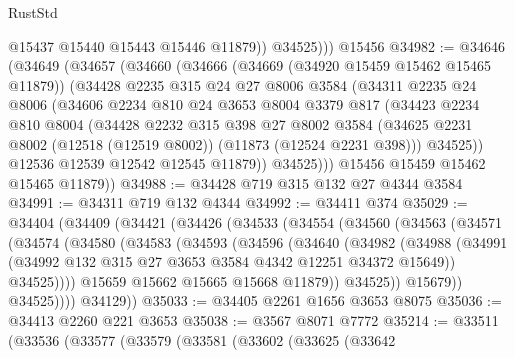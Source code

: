 \begin{lexlean}{RustStd}
\begin{coremodule}
              @15437
              @15440
              @15443
              @15446
              @11879))
          @34525)))
    @15456
@34982 := @34646
    (@34649
      (@34657
        (@34660
          (@34666
            (@34669 (@34920 @15459 @15462 @15465 @11879))
            (@34428
              @2235
              @315
              @24
              @27
              @8006
              @3584
              (@34311
                @2235
                @24
                @8006
                (@34606
                  @2234
                  @810
                  @24
                  @3653
                  @8004
                  @3379
                  @817
                  (@34423
                    @2234
                    @810
                    @8004
                    (@34428
                      @2232
                      @315
                      @398
                      @27
                      @8002
                      @3584
                      (@34625 @2231 @8002 (@12518 (@12519 @8002)) (@11873 (@12524 @2231 @398)))
                      @34525))
                  @12536
                  @12539
                  @12542
                  @12545
                  @11879))
              @34525)))
        @15456
        @15459
        @15462
        @15465
        @11879))
@34988 := @34428 @719 @315 @132 @27 @4344 @3584
@34991 := @34311 @719 @132 @4344
@34992 := @34411 @374
@35029 := @34404
    (@34409
      (@34421
        (@34426
          (@34533
            (@34554
              (@34560
                (@34563
                  (@34571
                    (@34574
                      (@34580
                        (@34583
                          (@34593
                            (@34596
                              (@34640
                                (@34982
                                  (@34988
                                    (@34991
                                      (@34992 @132 @315 @27 @3653 @3584 @4342 @12251 @34372 @15649))
                                    @34525))))
                            @15659
                            @15662
                            @15665
                            @15668
                            @11879))
                        @34525))
                    @15679))
                @34525))))
        @34129))
@35033 := @34405 @2261 @1656 @3653 @8075
@35036 := @34413 @2260 @221 @3653
@35038 := @3567 @8071 @7772
@35214 := @33511
    (@33536
      (@33577
        (@33579
          (@33581
            (@33602
              (@33625
                (@33642

\end{coremodule}
\end{lexlean}
